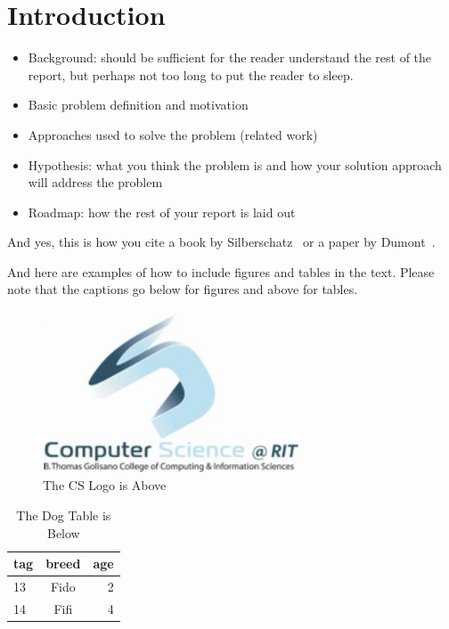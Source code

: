 \chapter{Introduction}



\begin{itemize}
\item{} Background: should be sufficient for the reader understand the rest of the report, but 
perhaps not too long to put the reader to sleep.
\item{} Basic problem definition and motivation
\item{} Approaches used to solve the problem (related work)
\item{} Hypothesis: what you think the problem is and how your solution 
approach will address the problem
\item{} Roadmap: how the rest of your report is laid out 
\end{itemize}

And yes, this is how you cite a book by Silberschatz~\cite{Silberschatz05-text} or a paper by Dumont~\cite{Dumont2007-robots}.

And here are examples of how to include figures and tables in the text. Please note that the captions go below for figures and above for tables.


\begin{figure}[ht]
\begin{center}
\includegraphics[width=3.0in]{cs-logo.jpg}
\end{center}
\caption{The CS Logo is Above}
\label{fig:lab}
\end{figure}


\begin{table}[h]
\caption{The Dog Table is Below}
  \begin{tabular}{ | l | c | r | }
    \hline
    tag & breed & age \\
    \hline \hline
    13 & Fido & 2 \\
    \hline
    14 & Fifi & 4 \\
    \hline
  \end{tabular}
\end{table}

